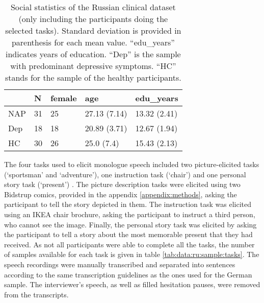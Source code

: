 \begin{table}[ht!]
\begin{center}
\begin{tabular}{lllll}
\hline
    & \textbf{N} & \textbf{female} & \textbf{age}  & \textbf{edu\_years} \\ \hline
NAP & 31         & 25              & 27.13 (7.14)  & 13.32 (2.41)        \\
Dep & 18         & 18              & 20.89 (3.71)  & 12.67 (1.94)        \\
HC  & 30  & 26     & 25.0 (7.4)    & 15.43 (2.13)        \\ \hline
\end{tabular}
\captionsetup{width=\textwidth}
\caption[Russian Clinical Dataset]{\label{tab:data:ru:sample} Social statistics of the Russian clinical dataset (only including the participants doing the selected tasks). Standard deviation is provided in parenthesis for each mean value. ``edu\_years'' indicates years of education. ``Dep'' is the sample with predominant depressive symptoms. ``HC'' stands for the sample of the healthy participants.}
\end{center}
\end{table}

The four tasks used to elicit monologue speech included two picture-elicited tasks (`sportsman' and `adventure'), one instruction task (`chair') and one personal story task (`present')
. The picture description tasks were elicited using two Bidstrup comics, provided in the appendix \ref{appendix:methods}, asking the participant to tell the story depicted in them. The instruction task was elicited using an IKEA chair brochure, asking the participant to instruct a third person, who cannot see the image. Finally, the personal story task was elicited by asking the participant to tell a story about the most memorable present that they had received. As not all participants were able to complete all the tasks, the number of samples available for each task is given in table \ref{tab:data:ru:sample:tasks}. The speech recordings were manually transcribed and separated into sentences according to the same transcription guidelines as the ones used for the German sample. The interviewer's speech, as well as filled hesitation pauses, were removed from the transcripts. 


